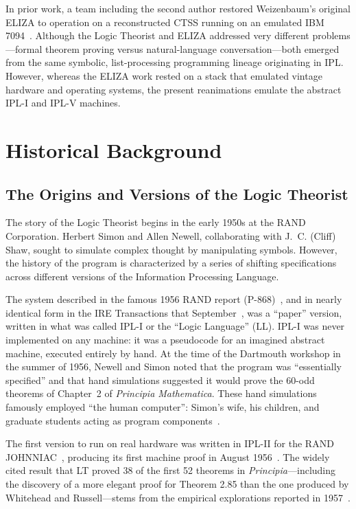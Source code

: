 \documentclass[journal]{IEEEtran}
\begin{document}
In prior work, a team including the second author restored
Weizenbaum's original ELIZA to operation on a reconstructed CTSS
running on an emulated IBM 7094~\cite{lane2025eliza}. Although the
Logic Theorist and ELIZA addressed very different problems---formal
theorem proving versus natural-language conversation---both emerged
from the same symbolic, list-processing programming lineage
originating in IPL. However, whereas the ELIZA work rested on a stack
that emulated vintage hardware and operating systems, the present
reanimations emulate the abstract IPL-I and IPL-V machines.

\section{Historical Background}
\label{sec:history}

\subsection{The Origins and Versions of the Logic Theorist}

The story of the Logic Theorist begins in the early 1950s at the RAND
Corporation. Herbert Simon and Allen Newell, collaborating with
J.~C. (Cliff) Shaw, sought to simulate complex thought by manipulating
symbols. However, the history of the program is characterized by a
series of shifting specifications across different versions of the
Information Processing Language.

The system described in the famous 1956 RAND report
(P-868)~\cite{LT1956a}, and in nearly identical form in the IRE
Transactions that September~\cite{LT1956b}, was a ``paper'' version,
written in what was called IPL-I or the ``Logic Language'' (LL). IPL-I
was never implemented on any machine: it was a pseudocode for an
imagined abstract machine, executed entirely by hand. At the time of
the Dartmouth workshop in the summer of 1956, Newell and Simon noted
that the program was ``essentially specified'' and that hand
simulations suggested it would prove the 60-odd theorems of Chapter~2
of \textit{Principia Mathematica}. These hand simulations famously
employed ``the human computer'': Simon's wife, his children, and
graduate students acting as program
components~\cite[Ch.~13]{simon1996models}.

The first version to run on real hardware was written in IPL-II for
the RAND JOHNNIAC~\cite{gruenberger1968johnniac,newellshaw1957},
producing its first machine proof in August
1956~\cite{simon1996models,newellshaw1957}. The widely cited result
that LT proved 38 of the first 52 theorems in
\textit{Principia}---including the discovery of a more elegant proof
for Theorem 2.85 than the one produced by Whitehead and
Russell---stems from the empirical explorations reported in
1957~\cite{LT1957}.
\end{document}
